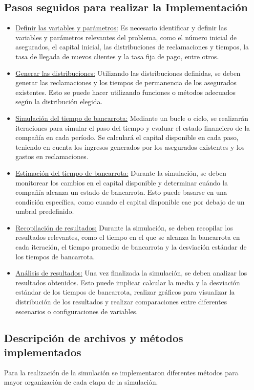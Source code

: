 \documentclass{article}
\begin{document}
 \subsection{Pasos seguidos para realizar la Implementación}
 \begin{itemize}
    \item \underline{Definir las variables y parámetros:} Es necesario identificar y definir las variables y parámetros relevantes del problema, como el número inicial de asegurados, el capital inicial, las distribuciones de reclamaciones y tiempos, la tasa de llegada de nuevos clientes y la tasa fija de pago, entre otros.
    \item \underline{Generar las distribuciones:} Utilizando las distribuciones definidas, se deben generar las reclamaciones y los tiempos de permanencia de los asegurados existentes. Esto se puede hacer utilizando funciones o métodos adecuados según la distribución elegida.
    \item \underline{Simulación del tiempo de bancarrota:} Mediante un bucle o ciclo, se realizarán iteraciones para simular el paso del tiempo y evaluar el estado financiero de la compañía en cada período. Se calculará el capital disponible en cada paso, teniendo en cuenta los ingresos generados por los asegurados existentes y los gastos en reclamaciones.
    \item \underline{Estimación del tiempo de bancarrota:} Durante la simulación, se deben monitorear los cambios en el capital disponible y determinar cuándo la compañía alcanza un estado de bancarrota. Esto puede basarse en una condición específica, como cuando el capital disponible cae por debajo de un umbral predefinido.
    \item \underline{Recopilación de resultados:} Durante la simulación, se deben recopilar los resultados relevantes, como el tiempo en el que se alcanza la bancarrota en cada iteración, el tiempo promedio de bancarrota y la desviación estándar de los tiempos de bancarrota.
    \item \underline{Análisis de resultados:} Una vez finalizada la simulación, se deben analizar los resultados obtenidos. Esto puede implicar calcular la media y la desviación estándar de los tiempos de bancarrota, realizar gráficos para visualizar la distribución de los resultados y realizar comparaciones entre diferentes escenarios o configuraciones de variables.
 \end{itemize}

 \subsection{Descripción de archivos y métodos implementados}
 Para la realización de la simulación se implementaron diferentes métodos para mayor organización de cada etapa de la simulación. 
\end{document}
